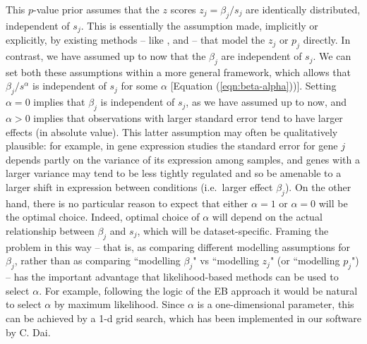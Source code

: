 This $p$-value prior assumes that the $z$ scores $z_j=\beta_j/s_j$
are identically distributed, independent of $s_j$. This is essentially the assumption made, implicitly or explicitly, by existing methods -- like \locfdr, \mixfdr and \qvalue --
that model the $z_j$ or $p_j$ directly.  In contrast, we have assumed up to now that the $\beta_j$ are independent of $s_j$. 
We can set both these assumptions within a more general framework, which allows that $\beta_j/s^\alpha$ is independent of $s_j$ for some $\alpha$ [Equation (\ref{eqn:beta-alpha}))]. Setting $\alpha=0$ implies that $\beta_j$ is
independent of $s_j$, as we have assumed up to now, and $\alpha>0$ implies that observations with larger standard error tend to have larger
effects (in absolute value). This latter assumption may often be qualitatively plausible: 
for example, in gene expression studies the standard error for gene $j$ depends partly on
the variance of its expression among samples, and genes with a larger variance may tend to be less tightly regulated and
so be amenable to a larger shift in expression between conditions (i.e.~larger effect $\beta_j$).
On the other hand, there is no particular reason to expect that either $\alpha=1$ or $\alpha=0$ will be the optimal choice.
Indeed, optimal choice of $\alpha$ will depend on the actual relationship between $\beta_j$ and $s_j$,
which will be dataset-specific. 
Framing the problem in this way -- that is, as comparing different modelling assumptions for $\beta_j$, rather than as 
comparing ``modelling $\beta_j$" vs  ``modelling $z_j$" (or ``modelling $p_j$") -- has the important advantage that 
likelihood-based methods can be used to select $\alpha$. For example, following the logic of the EB approach it
would be natural to select $\alpha$ by maximum likelihood. Since $\alpha$ is a one-dimensional parameter, this can be achieved by a 1-d grid search,
which has been implemented in our software by C. Dai.